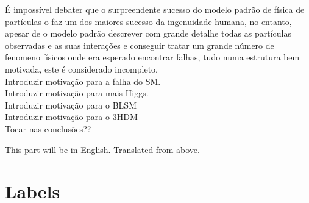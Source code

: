 \documentclass[12pt]{report}
\renewcommand{\(}{\left(}
\renewcommand{\)}{\right)}
\renewcommand{\[}{\left[}
\renewcommand{\]}{\right]}
\begin{document}
\TitlePage
  \vspace*{55mm}
       {É impossível debater que o surpreendente sucesso do modelo padrão de física de partículas o faz um dos maiores sucesso da ingenuidade humana, no entanto, apesar de o modelo padrão descrever com grande detalhe todas as partículas observadas e as suas interações e conseguir tratar um grande número de fenomeno  físicos onde era esperado encontrar falhas, tudo numa estrutura bem motivada, este é considerado incompleto. \\ { \color{green} 
Introduzir motivação para a falha do SM. \\
Introduzir motivação para mais Higgs. \\ 
Introduzir motivação para o BLSM \\ 
Introduzir motivação para o 3HDM} \\ 
{\color{blue} Tocar nas conclusões?? }
       }
\EndTitlePage
\titlepage\ \endtitlepage %

\TitlePage
  \vspace*{55mm}
       {
       This part will be in English. Translated from above. 
       }
\EndTitlePage
\titlepage\ \endtitlepage %


\tableofcontents

\cleardoublepage
\listoffigures

\cleardoublepage
\listoftables

\cleardoublepage

\setcounter{page}{1}

\section{Labels}
\end{document}
